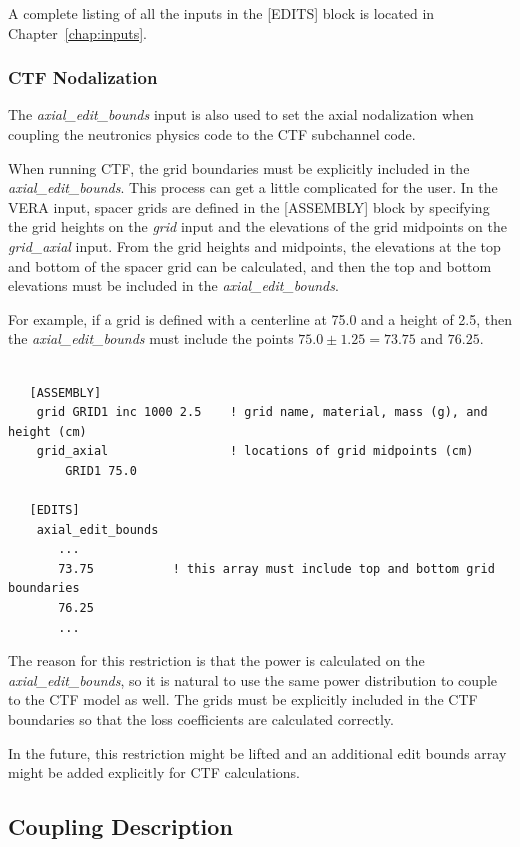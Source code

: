 A complete listing of all the inputs in the [EDITS] block is located in Chapter~\ref{chap:inputs}.

\subsubsection{CTF Nodalization}

The {\it axial\_edit\_bounds} input is also used to set the axial nodalization when coupling
the neutronics physics code to the CTF subchannel code.

When running CTF, the grid boundaries must be explicitly
included in the {\it axial\_edit\_bounds}. This process can get a little complicated for the user.
In the VERA input, spacer grids are defined in the [ASSEMBLY] block by specifying the
grid heights on the {\it grid} input and the elevations of the grid midpoints
on the {\it grid\_axial} input.
From the grid heights and midpoints, the elevations at the top and bottom of the spacer grid
can be calculated, and then the top and bottom elevations must be included
in the {\it axial\_edit\_bounds}.

For example, if a grid is defined with a centerline at 75.0 and a height of 2.5, then the
{\it axial\_edit\_bounds} must include the points $75.0 \pm 1.25 = 73.75$ and $76.25$.

\begin{Verbatim}[fontsize=\small]

   [ASSEMBLY]
    grid GRID1 inc 1000 2.5    ! grid name, material, mass (g), and height (cm)
    grid_axial                 ! locations of grid midpoints (cm)
        GRID1 75.0

   [EDITS]
    axial_edit_bounds
       ...
       73.75           ! this array must include top and bottom grid boundaries
       76.25
       ...

\end{Verbatim}

The reason for this restriction is that the power is calculated on the {\it axial\_edit\_bounds},
so it is natural to use the same power distribution to couple to the CTF model as well.
The grids must be explicitly included in the CTF boundaries so that the loss coefficients are calculated correctly.

In the future, this restriction might be lifted and an additional edit bounds array might
be added explicitly for CTF calculations.


\subsection{Coupling Description}

